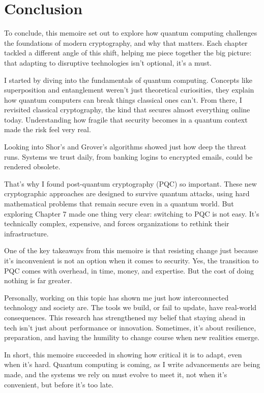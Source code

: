\chapter{Conclusion}\label{chap:conclusion}

To conclude, this memoire set out to explore how quantum computing challenges the foundations of modern cryptography, and why that matters. Each chapter tackled a different angle of this shift, helping me piece together the big picture: that adapting to disruptive technologies isn’t optional, it’s a must.

I started by diving into the fundamentals of quantum computing. Concepts like \gls{superposition} and \gls{entanglement} weren’t just theoretical curiosities, they explain how quantum computers can break things classical ones can’t. From there, I revisited classical cryptography, the kind that secures almost everything online today. Understanding how fragile that security becomes in a quantum context made the risk feel very real.

Looking into Shor’s and Grover’s algorithms showed just how deep the threat runs. Systems we trust daily, from banking logins to encrypted emails, could be rendered obsolete.

That’s why I found post-quantum cryptography (PQC) so important. These new cryptographic approaches are designed to survive quantum attacks, using hard mathematical problems that remain secure even in a quantum world. But exploring Chapter 7 made one thing very clear: switching to PQC is not easy. It’s technically complex, expensive, and forces organizations to rethink their infrastructure.

One of the key takeaways from this memoire is that resisting change just because it’s inconvenient is not an option when it comes to security. Yes, the transition to PQC comes with overhead, in time, money, and expertise. But the cost of doing nothing is far greater.

Personally, working on this topic has shown me just how interconnected technology and society are. The tools we build, or fail to update, have real-world consequences. This research has strengthened my belief that staying ahead in tech isn’t just about performance or innovation. Sometimes, it’s about resilience, preparation, and having the humility to change course when new realities emerge.

In short, this memoire succeeded in showing how critical it is to adapt, even when it’s hard. Quantum computing is coming, as I write advancements are being made, and the systems we rely on must evolve to meet it, not when it's convenient, but before it’s too late.
